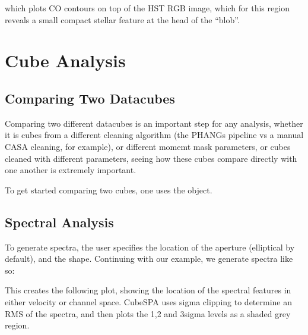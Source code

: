 \documentclass[letterpaper,10pt,english]{sphinxmanual}
\let\sphinxpxdimen\pdfpxdimen\else\newdimen\sphinxpxdimen
\begin{document}
\noindent\sphinxincludegraphics[width=600\sphinxpxdimen]{{rgb_overlay}.png}

\sphinxAtStartPar
which plots CO contours on top of the HST RGB image, which for this region reveals
a small compact stellar feature at the head of the  “blob”.


\chapter{Cube Analysis}
\label{\detokenize{index:cube-analysis}}
\sphinxstepscope


\section{Comparing Two Datacubes}
\label{\detokenize{cube_comparison:comparing-two-datacubes}}\label{\detokenize{cube_comparison::doc}}
\sphinxAtStartPar
Comparing two different datacubes is an important step for any analysis, whether it is cubes from a different
cleaning algorithm (the PHANGs pipeline vs a manual CASA cleaning, for example),
or different momemt mask parameters,
or cubes cleaned with different parameters, seeing how these cubes compare directly with one another is
extremely important.

\sphinxAtStartPar
To get started comparing two cubes, one uses the  object.

\sphinxstepscope


\section{Spectral Analysis}
\label{\detokenize{spectra:spectral-analysis}}\label{\detokenize{spectra::doc}}
\sphinxAtStartPar
To generate spectra, the user specifies the location of the aperture (elliptical by default), and the shape.
Continuing with our  example, we generate spectra like so:

\begin{sphinxVerbatim}[commandchars=\\\{\}]
    
\end{sphinxVerbatim}

\sphinxAtStartPar
This creates the following plot, showing the location of the spectral features in either velocity or channel
space. CubeSPA uses sigma clipping to determine an RMS of the spectra, and then plots the 1,2 and 3\sphinxhyphen{}sigma levels
as a shaded grey region.
\end{document}
